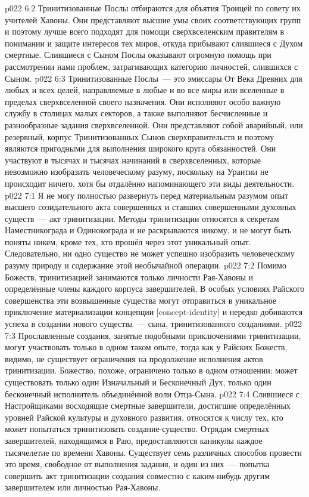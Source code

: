 \vs p022 6:2 Тринитизованные Послы отбираются для объятия Троицей по совету их учителей Хавоны. Они представляют высшие умы своих соответствующих групп и поэтому лучше всего подходят для помощи сверхвселенским правителям в понимании и защите интересов тех миров, откуда прибывают слившиеся с Духом смертные. Слившиеся с Сыном Послы оказывают огромную помощь при рассмотрении нами проблем, затрагивающих категорию личностей, слившихся с Сыном.
\vs p022 6:3 Тринитизованные Послы~--- это эмиссары От Века Древних для любых и всех целей, направляемые в любые и во все миры или вселенные в пределах сверхвселенной своего назначения. Они исполняют особо важную службу в столицах малых секторов, а также выполняют бесчисленные и разнообразные задания сверхвселенной. Они представляют собой аварийный, или резервный, корпус Тринитизованных Сынов сверхправительств и поэтому являются пригодными для выполнения широкого круга обязанностей. Они участвуют в тысячах и тысячах начинаний в сверхвселенных, которые невозможно изобразить человеческому разуму, поскольку на Урантии не происходит ничего, хотя бы отдалённо напоминающего эти виды деятельности.
\vs p022 7:1 Я не могу полностью развернуть перед материальным разумом опыт высшего созидательного акта совершенных и ставших совершенными духовных существ~--- акт тринитизации. Методы тринитизации относятся к секретам Наместникограда и Одинокограда и не раскрываются никому, и не могут быть поняты никем, кроме тех, кто прошёл через этот уникальный опыт. Следовательно, ни одно существо не может успешно изобразить человеческому разуму природу и содержание этой необычайной операции.
\vs p022 7:2 Помимо Божеств, тринитизацией занимаются только личности Рая\hyp{}Хавоны и определённые члены каждого корпуса завершителей. В особых условиях Райского совершенства эти возвышенные существа могут отправиться в уникальное приключение материализации концепции [concept\hyp{}identity] и нередко добиваются успеха в создании нового существа~--- сына, тринитизованного созданиями.
\vs p022 7:3 Прославленные создания, занятые подобными приключениями тринитизации, могут участвовать только в одном таком опыте, тогда как у Райских Божеств, видимо, не существует ограничения на продолжение исполнения актов тринитизации. Божество, похоже, ограничено только в одном отношении: может существовать только один Изначальный и Бесконечный Дух, только один бесконечный исполнитель объединённой воли Отца\hyp{}Сына.
\vs p022 7:4 Слившиеся с Настройщиками восходящие смертные завершители, достигшие определённых уровней Райской культуры и духовного развития, относятся к числу тех, кто может попытаться тринитизовать создание\hyp{}существо. Отрядам смертных завершителей, находящимся в Раю, предоставляются каникулы каждое тысячелетие по времени Хавоны. Существует семь различных способов провести это время, свободное от выполнения задания, и один из них~--- попытка совершить акт тринитизации создания совместно с каким\hyp{}нибудь другим завершителем или личностью Рая\hyp{}Хавоны.
